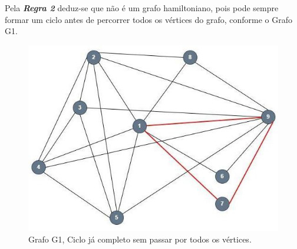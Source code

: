 \documentclass{report}
\begin{document}
Pela \textit{\textbf{Regra 2}} deduz-se que não é um grafo hamiltoniano, pois pode sempre formar um ciclo antes de percorrer todos os vértices do grafo, conforme o Grafo G1.

\begin{figure}[h]
    \centering
    \includegraphics[width=12cm]{Imagem_3_Geral.png}
    \caption{Grafo G1, Ciclo já completo sem passar por todos os vértices.}
    \label{fig3}
\end{figure}
\end{document}
